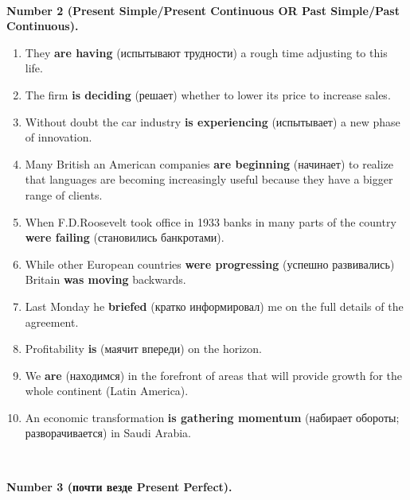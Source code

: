 \documentclass[main.tex]{subfiles}
\begin{document}
\ 

\textbf{Number 2 (Present Simple/Present Continuous OR Past Simple/Past Continuous).}

\begin{enumerate}[nosep]
	\item They \textbf{are having} (испытывают трудности) a rough time adjusting to this life.
	\item The firm \textbf{is deciding} (решает) whether to lower its price to increase sales.
	\item Without doubt the car industry \textbf{is experiencing} (испытывает) a new phase of innovation.
	\item Many British an American companies \textbf{are beginning} (начинает) to realize that languages are becoming increasingly useful because they have a bigger range of clients.
	\item When F.D.Roosevelt took office in 1933 banks in many parts of the country \textbf{were failing} (становились банкротами).
	\item While other European countries \textbf{were progressing} (успешно развивались) Britain \textbf{was moving} backwards.
	\item Last Monday he \textbf{briefed} (кратко информировал) me on the full details of the agreement.
	\item Profitability \textbf{is} (маячит впереди) on the horizon.
	\item We \textbf{are} (находимся) in the forefront of areas that will provide growth for the whole continent (Latin America).
	\item An economic transformation \textbf{is gathering momentum} (набирает обороты; разворачивается) in Saudi Arabia.
\end{enumerate}
\ 

\textbf{Number 3 (почти везде Present Perfect).}
\end{document}
